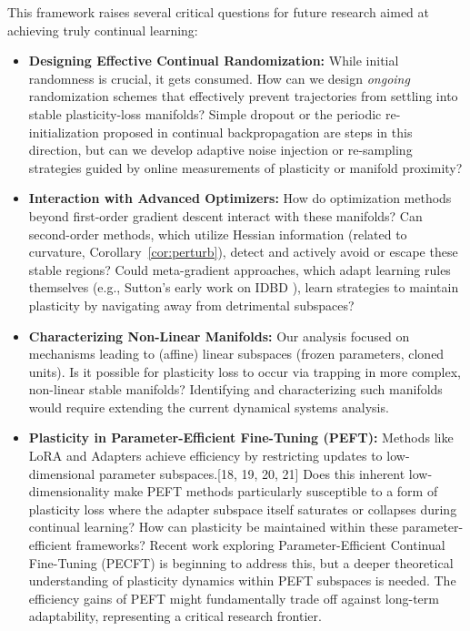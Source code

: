 \documentclass{article}
\begin{document}
This framework raises several critical questions for future research aimed at achieving truly continual learning:

\begin{itemize}[nosep]
    \item \textbf{Designing Effective Continual Randomization:} While initial randomness is crucial, it gets consumed. How can we design \emph{ongoing} randomization schemes that effectively prevent trajectories from settling into stable plasticity-loss manifolds? Simple dropout \cite{srivastava2014dropout} or the periodic re-initialization proposed in continual backpropagation \cite{dohare2024loss} are steps in this direction, but can we develop adaptive noise injection or re-sampling strategies guided by online measurements of plasticity or manifold proximity?
    \item \textbf{Interaction with Advanced Optimizers:} How do optimization methods beyond first-order gradient descent interact with these manifolds? Can second-order methods, which utilize Hessian information (related to curvature, Corollary~\ref{cor:perturb}), detect and actively avoid or escape these stable regions? Could meta-gradient approaches, which adapt learning rules themselves (e.g., Sutton's early work on IDBD \cite{sutton1992gain}), learn strategies to maintain plasticity by navigating away from detrimental subspaces? 
    \item \textbf{Characterizing Non-Linear Manifolds:} Our analysis focused on mechanisms leading to (affine) linear subspaces (frozen parameters, cloned units). Is it possible for plasticity loss to occur via trapping in more complex, non-linear stable manifolds? Identifying and characterizing such manifolds would require extending the current dynamical systems analysis.
    \item \textbf{Plasticity in Parameter-Efficient Fine-Tuning (PEFT):} Methods like LoRA \cite{hu2021lora} and Adapters \cite{houlsby2019parameter} achieve efficiency by restricting updates to low-dimensional parameter subspaces.[18, 19, 20, 21] Does this inherent low-dimensionality make PEFT methods particularly susceptible to a form of plasticity loss where the adapter subspace itself saturates or collapses during continual learning? How can plasticity be maintained within these parameter-efficient frameworks? Recent work exploring Parameter-Efficient Continual Fine-Tuning (PECFT) is beginning to address this, but a deeper theoretical understanding of plasticity dynamics within PEFT subspaces is needed. The efficiency gains of PEFT might fundamentally trade off against long-term adaptability, representing a critical research frontier.
\end{itemize}
\end{document}
